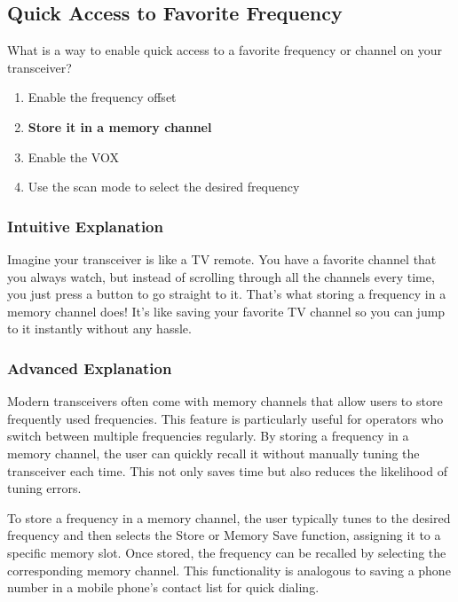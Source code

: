 \subsection{Quick Access to Favorite Frequency}
\label{T4B04}

\begin{tcolorbox}[colback=gray!10!white,colframe=black!75!black,title=T4B04]
What is a way to enable quick access to a favorite frequency or channel on your transceiver?
\begin{enumerate}[label=\Alph*]
    \item Enable the frequency offset
    \item \textbf{Store it in a memory channel}
    \item Enable the VOX
    \item Use the scan mode to select the desired frequency
\end{enumerate}
\end{tcolorbox}

\subsubsection*{Intuitive Explanation}
Imagine your transceiver is like a TV remote. You have a favorite channel that you always watch, but instead of scrolling through all the channels every time, you just press a button to go straight to it. That's what storing a frequency in a memory channel does! It’s like saving your favorite TV channel so you can jump to it instantly without any hassle.

\subsubsection*{Advanced Explanation}
Modern transceivers often come with memory channels that allow users to store frequently used frequencies. This feature is particularly useful for operators who switch between multiple frequencies regularly. By storing a frequency in a memory channel, the user can quickly recall it without manually tuning the transceiver each time. This not only saves time but also reduces the likelihood of tuning errors. 

To store a frequency in a memory channel, the user typically tunes to the desired frequency and then selects the Store or Memory Save function, assigning it to a specific memory slot. Once stored, the frequency can be recalled by selecting the corresponding memory channel. This functionality is analogous to saving a phone number in a mobile phone's contact list for quick dialing.

